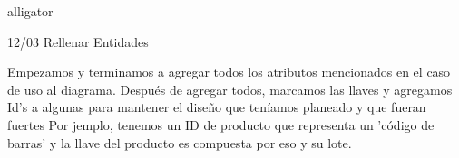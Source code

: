 \documentclass[10pt]{article}
\begin{document}
\begin{labeling}{alligator}
		\item [12/03] Rellenar Entidades
            
            Empezamos y terminamos a agregar todos los atributos mencionados en el caso
            de uso al diagrama. Después de agregar todos, marcamos las llaves y agregamos
            Id's a algunas para mantener el diseño que teníamos planeado y que fueran fuertes
            Por jemplo, tenemos un ID de producto que representa un 'código de barras' y la
            llave del producto es compuesta por eso y su lote.
		
	\end{labeling}
	
	
	
\end{document}
